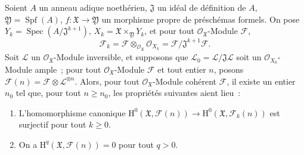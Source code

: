 \begin{proposition}[5.2.3]
\label{III.5.2.3-fr}
Soient $A$ un anneau adique noethérien, $\mathfrak J$ un idéal de définition de
$A$, $\mathfrak Y=\operatorname{Spf}(A)$,
$f:\mathfrak X\to\mathfrak Y$ un morphisme propre de préschémas formels. On pose
$Y_k=\operatorname{Spec}(A/\mathfrak J^{k+1})$,
$X_k=\mathfrak X\times_{\mathfrak Y}Y_k$, et pour tout
$\mathcal O_{\mathfrak X}$-Module $\mathcal F$,
\[
\mathcal F_k=\mathcal F\otimes_{\mathcal O_{\mathfrak X}}\mathcal O_{X_k}
=\mathcal F/\mathfrak J^{k+1}\mathcal F.
\]
Soit $\mathcal L$ un $\mathcal O_{\mathfrak X}$-Module inversible, et supposons que
$\mathcal L_0=\mathcal L/\mathfrak J\mathcal L$ soit un
$\mathcal O_{X_0}$-Module ample~; pour tout $\mathcal O_{\mathfrak X}$-Module
$\mathcal F$ et tout entier $n$, posons
$\mathcal F(n)=\mathcal F\otimes\mathcal L^{\otimes n}$. Alors, pour tout
$\mathcal O_{\mathfrak X}$-Module cohérent $\mathcal F$, il existe un entier $n_0$
tel que, pour tout $n\geq n_0$, les propriétés suivantes aient lieu~:
\begin{enumerate}
\item[(i)] L'homomorphisme canonique
$\mathrm H^0(\mathfrak X,\mathcal F(n))\to
\mathrm H^0(\mathfrak X,\mathcal F_k(n))$ est surjectif pour tout $k\geq0$.
\item[(ii)] On a $\mathrm H^q(\mathfrak X,\mathcal F(n))=0$ pour tout $q>0$.
\end{enumerate}
\end{proposition}

